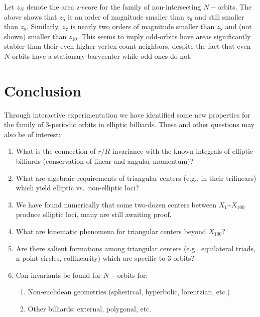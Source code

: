 \documentclass[]{article}
\providecommand{\tightlist}{%
  \setlength{\itemsep}{0pt}\setlength{\parskip}{0pt}}
\begin{document}
Let \(z_N\) denote the area z-score for the family of non-intersecting \(N-\)orbits. The above shows that \(z_5\) is an order of magnitude smaller than \(z_6\) and still smaller than \(z_8\). Similarly, \(z_7\) is nearly two orders of magnitude smaller than \(z_8\) and (not shown) smaller than \(z_{10}\). This seems to imply odd-orbits have areas significantly stabler than their even higher-vertex-count neighbors, despite the fact that even-\(N\) orbits have a stationary barycenter while odd ones do not.

\hypertarget{conclusion}{%
\section{Conclusion}\label{conclusion}}

Through interactive experimentation we have identified some new properties for the family of 3-periodic orbits in elliptic billiards. These and other questions may also be of interest:

\begin{enumerate}
\def\labelenumi{\arabic{enumi}.}
\tightlist
\item
  What is the connection of \(r/R\) invariance with the known integrals of elliptic billiards (conservation of linear and angular momentum)?
\item
  What are algebraic requirements of triangular centers (e.g., in their trilinears) which yield elliptic vs.~non-elliptic loci?
\item
  We have found numerically that some two-dozen centers between \(X_1\)\textasciitilde{}\(X_{100}\) produce elliptic loci, many are still awaiting proof.
\item
  What are kinematic phenomena for triangular centers beyond \(X_{100}\)?
\item
  Are there salient formations among triangular centers (e.g., equilateral triads, n-point-circles, collinearity) which are specific to 3-orbits?
\item
  Can invariants be found for \(N-\)orbits for:

  \begin{enumerate}
  \def\labelenumii{\arabic{enumii}.}
  \tightlist
  \item
    Non-euclidean geometries (spherircal, hyperbolic, lorentzian, etc.)
  \item
    Other billiards: external, polygonal, etc.
  \end{enumerate}
\end{enumerate}
\end{document}
